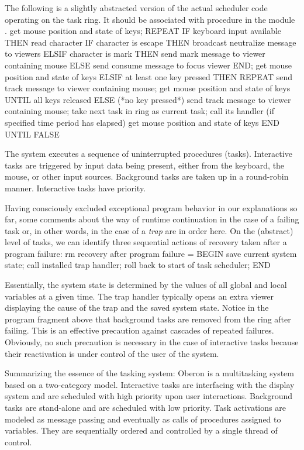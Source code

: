 The following is a slightly abstracted version of the actual scheduler
code operating on the task ring. It should be associated with
procedure  in the module .
\begintt
get mouse position and state of keys;
REPEAT
  IF keyboard input available THEN read character
    IF character is escape THEN
      broadcast neutralize message to viewers
    ELSIF character is mark THEN
      send mark message to viewer containing mouse
    ELSE send consume message to focus viewer
    END;
    get mouse position and state of keys
  ELSIF at least one key pressed THEN
    REPEAT
      send track message to viewer containing mouse;
      get mouse position and state of keys
    UNTIL all keys released
  ELSE (*no key pressed*)
    send track message to viewer containing mouse;
    take next task in ring as current task;
    call its handler (if specified time period has elapsed)
    get mouse position and state of keys
  END
UNTIL FALSE
\endtt

\noindent The system executes a sequence of uninterrupted procedures
(tasks). Interactive tasks are triggered by input data being present,
either from the keyboard, the mouse, or other input
sources. Background tasks are taken up in a round-robin
manner. Interactive tasks have priority.

Having consciously excluded exceptional program behavior in our
explanations so far, some comments about the way of runtime
continuation in the case of a failing task or, in other words, in the
case of a \emph{trap} are in order here. On the (abstract) level of tasks, we
can identify three sequential actions of recovery taken after a
program failure: %
\begintt
rm recovery after program failure =
BEGIN
  save current system state;
  call installed trap handler;
  roll back to start of task scheduler;
END
\endtt

\noindent Essentially, the system state is determined by the values of all
global and local variables at a given time. The trap handler typically
opens an extra viewer displaying the cause of the trap and the saved
system state. Notice in the program fragment above that background
tasks are removed from the ring after failing. This is an effective
precaution against cascades of repeated failures. Obviously, no such
precaution is necessary in the case of interactive tasks because their
reactivation is under control of the user of the system.

Summarizing the essence of the tasking system: Oberon is a
multitasking system based on a two-category model. Interactive tasks
are interfacing with the display system and are scheduled with high
priority upon user interactions. Background tasks are stand-alone and
are scheduled with low priority. Task activations are modeled as
message passing and eventually as calls of procedures assigned to
variables. They are sequentially ordered and controlled by a single
thread of control.

